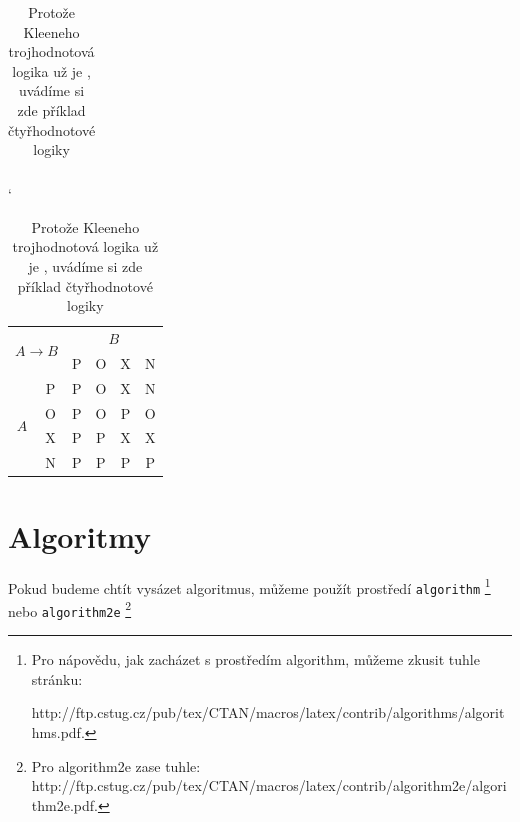 \documentclass[a4paper, 11pt]{article}
\begin{document}
\begin{table}[h]
\begin{minipage}{.20\linewidth}
\begin{tabular}{|c|c|c|c|c|c|}
\end{tabular}
\end{minipage}
\hspace{1cm}
\begin{minipage}{.20\linewidth}
\centering
\catcode`
\begin{tabular}{|c|c|c|c|c|c|}\hline
\multicolumn{2}{|c|}{\multirow{2}{*}{$A \rightarrow B$}} & \multicolumn{4}{|c|}{$B$} \\ \cline{3-6}
\multicolumn{1}{|c}{}&  & P & O & X & N \\ \hline
& P & P & O & X & N \\ \cline{2-6}
\multirow{2}{*}{$A$} & O & P & O & P & O \\ \cline{2-6}
& X & P & P & X & X \\ \cline{2-6}
& N & P & P & P & P \\ \hline

\end{tabular}
\end{minipage}
\caption{Protože Kleeneho trojhodnotová logika už je , uvádíme si zde příklad čtyřhodnotové logiky}
\end{table}

\pagebreak
\section{Algoritmy} 
\label{algoritmy}

Pokud budeme chtít vysázet algoritmus, můžeme použít prostředí \texttt{algorithm} \footnote{Pro nápovědu, jak zacházet s prostředím algorithm, můžeme zkusit tuhle stránku: \par http://ftp.cstug.cz/pub/tex/CTAN/macros/latex/contrib/algorithms/algorithms.pdf.} nebo \texttt{algorithm2e} \footnote{Pro algorithm2e zase tuhle: http://ftp.cstug.cz/pub/tex/CTAN/macros/latex/contrib/algorithm2e/algorithm2e.pdf.}

\end{document}
